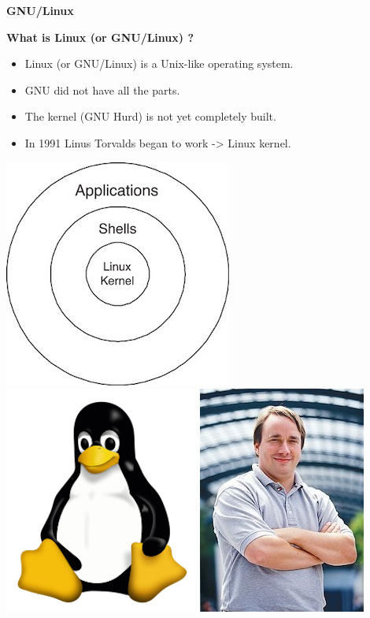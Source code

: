 \documentclass[ignorenonframetext,]{beamer}
\providecommand{\tightlist}{%
  \setlength{\itemsep}{0pt}\setlength{\parskip}{0pt}}
\begin{document}
\begin{frame}{\textbf{GNU/Linux}}

\begin{block}{\textbf{What is Linux (or GNU/Linux) ?}}

\begin{itemize}
\tightlist
\item
  Linux (or GNU/Linux) is a Unix-like operating system.
\item
  GNU did not have all the parts.
\item
  The kernel (GNU Hurd) is not yet completely built.
\item
  In 1991 Linus Torvalds began to work -\textgreater{} Linux kernel.
\end{itemize}

\includegraphics{kernel.jpg} \includegraphics{linux_logo.png}
\includegraphics{linus.jpeg}


\end{block}
\end{frame}
\end{document}
